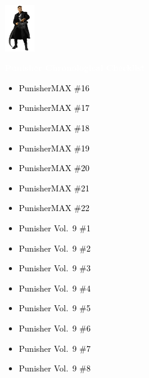 \documentclass[12pt]{article}
\newcommand{\checkbox}{\raisebox{0.0ex}{\fbox{\rule{0ex}{1.5ex} \rule{1.5ex}{0ex}}}}
\begin{document}
\begin{center}
    \vspace*{2cm}
    \includegraphics[width=0.1\textwidth]{PUNISHER1.PNG}
    \vspace{0.3cm}

    {\Huge \textbf{\textcolor{white}{Punisher Chronological Checklist}}}
\end{center}

\vspace{0.3cm}
\noindent
\begin{tcolorbox}[
  colback=white!95!gray,
  colframe=black,
  width=\textwidth,
  arc=4mm,
  auto outer arc,
  boxrule=0.8pt,
  left=8pt,right=8pt,top=8pt,bottom=8pt
]
\begin{itemize}[left=0pt,label={\checkbox}]
    \item \textcolor{black}{PunisherMAX \#16}
    \item \textcolor{black}{PunisherMAX \#17}
    \item \textcolor{black}{PunisherMAX \#18}
    \item \textcolor{black}{PunisherMAX \#19}
    \item \textcolor{black}{PunisherMAX \#20}
    \item \textcolor{black}{PunisherMAX \#21}
    \item \textcolor{black}{PunisherMAX \#22}
    \item \textcolor{black}{Punisher Vol.\ 9 \#1}
    \item \textcolor{black}{Punisher Vol.\ 9 \#2}
    \item \textcolor{black}{Punisher Vol.\ 9 \#3}
    \item \textcolor{black}{Punisher Vol.\ 9 \#4}
    \item \textcolor{black}{Punisher Vol.\ 9 \#5}
    \item \textcolor{black}{Punisher Vol.\ 9 \#6}
    \item \textcolor{black}{Punisher Vol.\ 9 \#7}
    \item \textcolor{black}{Punisher Vol.\ 9 \#8}
\end{itemize}
\end{tcolorbox}
\end{document}
